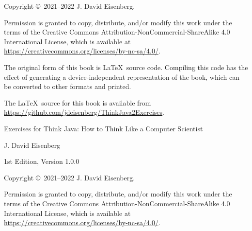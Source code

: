 \documentclass[12pt]{book}
\newcommand{\thetitle}{Exercises for Think Java}
\newcommand{\thesubtitle}{How to Think Like a Computer Scientist}
\newcommand{\theauthors}{J. David Eisenberg}
\newcommand{\theversion}{1st Edition, Version 1.0.0}
\theoremstyle{exercise}
\begin{document}
\begin{latexonly}
\newpage
\thispagestyle{empty}

Copyright \copyright ~2021--2022 \theauthors.

\vspace{0.2in}


Permission is granted to copy, distribute, and/or modify this work under the terms of the Creative Commons Attribution-NonCommercial-ShareAlike 4.0 International License, which is available at \url{https://creativecommons.org/licenses/by-nc-sa/4.0/}.

The original form of this book is \LaTeX\ source code.
Compiling this code has the effect of generating a device-independent representation of the book, which can be converted to other formats and printed.

The \LaTeX\ source for this book is available from \url{https://github.com/jdeisenberg/ThinkJava2Exercises}.


\cleardoublepage
\setcounter{tocdepth}{1}
\tableofcontents

\end{latexonly}


\begin{htmlonly}

\vspace{1em}

{\Large \thetitle: \thesubtitle}

{\large \theauthors}

\theversion

\vspace{1em}

Copyright \copyright ~2021--2022 \theauthors.

Permission is granted to copy, distribute, and/or modify this work under the terms of the Creative Commons Attribution-NonCommercial-ShareAlike 4.0 International License, which is available at \url{https://creativecommons.org/licenses/by-nc-sa/4.0/}.

\vspace{1em}

\end{htmlonly}
\end{document}
